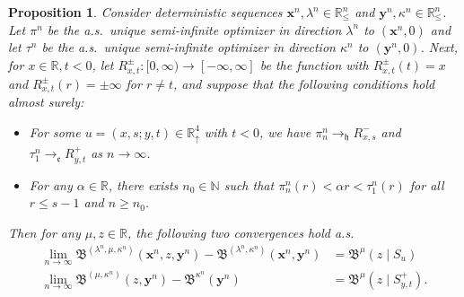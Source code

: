 \documentclass[10pt,a4paper]{amsart}
\newtheorem{proposition}{Proposition}
\newcommand{\N}{\mathbb{N}}
\newcommand{\R}{\mathbb{R}}
\newcommand{\Rd}{\mathbb{R}^4_\uparrow}
\newcommand{\al}{\alpha}
\newcommand{\bx}{\mathbf{x}}
\newcommand{\by}{\mathbf{y}}
\newcommand{\ka}{\kappa}
\newcommand{\la}{\lambda}
\begin{document}
\begin{proposition}
	\label{P:busemann-quadrangle}
	Consider deterministic sequences $\bx^n, \la^n \in \R^n_\le$ and $\by^n, \kappa^n \in \R^n_\le$. Let $\pi^n$ be the a.s.\ unique semi-infinite optimizer in direction $\la^n$ to $(\bx^n, 0)$ and let $\tau^n$ be the a.s.\ unique semi-infinite optimizer in direction $\ka^n$ to $(\by^n, 0)$. Next, for $x \in \R, t < 0$, let $R_{x, t}^\pm:[0, \infty) \to [-\infty, \infty]$ be the function with $R_{x, t}^\pm(t) = x$ and $R_{x, t}^\pm(r) = \pm \infty$ for $r \ne t$, and suppose that the following conditions hold almost surely:
	\begin{itemize}
		\item For some $u = (x, s; y, t) \in \Rd$ with $t < 0$, we have $\pi^n_n \to_{\mathfrak h} R^-_{x, s}$ and $\tau^n_1 \to_{\mathfrak e} R^+_{y, t}$ as $n \to \infty$.
		\item For any $\al \in \R$, there exists $n_0 \in \N$ such that 
		$
		\pi^n_n(r) < \al r < \tau^n_1(r)  
		$
		for all $r \le s - 1$ and $n \ge n_0$.
	\end{itemize}  
	Then for any $\mu, z \in \R$, the following two convergences hold a.s.
	\begin{align}
	\label{E:slit-convergence}
	\lim_{n \to \infty} \mathfrak B^{(\la^n, \mu, \kappa^n)}(\bx^n, z, \by^n) - \mathfrak B^{(\la^n, \kappa^n)}(\bx^n, \by^n) &= \mathfrak B^{\mu}(z \mid S_u) \\
	\label{E:single-slit-convergence}
	\lim_{n \to \infty} \mathfrak B^{(\mu, \kappa^n)}(z, \by^n) - \mathfrak B^{\kappa^n}(\by^n) &= \mathfrak B^{\mu}(z \mid S_{y, t}^+).
	\end{align}
\end{proposition}
\end{document}
